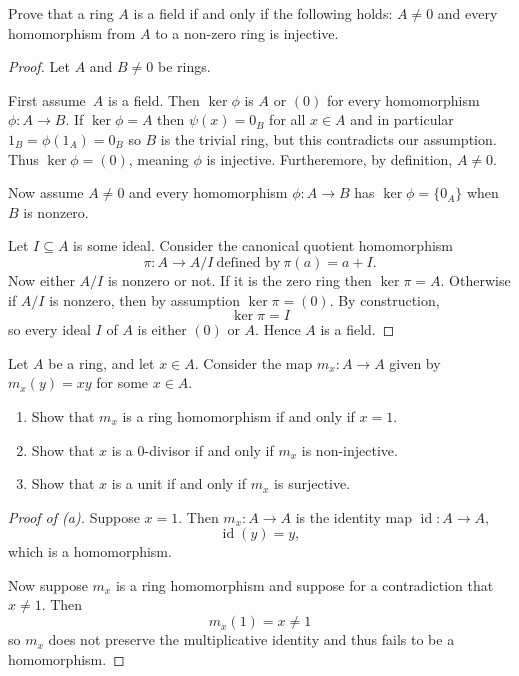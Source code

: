 \begin{prob}
    Prove that a ring $A$ is a field if and only if 
    the following holds: $A \neq 0$ and every homomorphism 
    from $A$ to a non-zero ring is injective. 
\end{prob}
\begin{proof}
    Let $A$ and $B \neq 0$ be rings. 

    First assume $A$ is a field. 
    Then $\ker \phi$ is $A$ or $(0)$ for every homomorphism 
    $\phi : A \to B$. If $\ker \phi = A$ then 
    $\psi(x) = 0_B$ for all $x \in A$ and in particular 
    $1_B = \phi(1_A) = 0_B$ so $B$ is the trivial ring, but 
    this contradicts our assumption. Thus 
    $\ker \phi = (0)$, meaning $\phi$ is injective. Furtheremore, 
    by definition, $A \neq 0$.
    
    Now assume $A \neq 0$ and every homomorphism 
    $\phi : A \to B$ has $\ker \phi = \{0_A\}$ when $B$ is nonzero. 

    Let $I \subseteq A$ is some ideal. Consider the canonical 
    quotient homomorphism 
    \[
        \pi : A \to A/I \ \text{defined by} \ 
        \pi(a) = a+I. 
    \]
    Now either $A/I$ is nonzero or not. If it is the zero ring 
    then $\ker \pi = A$. 
    Otherwise if $A/I$ is nonzero, then by assumption 
    $\ker \pi = (0)$. By construction, 
    \[
        \ker \pi = I
    \]
    so every ideal $I$ of $A$ is either $(0)$ or $A$. Hence 
    $A$ is a field. 
\end{proof}

\begin{prob}
    Let $A$ be a ring, and let $x \in A$. Consider 
    the map $m_x : A \to A$ given by $m_x(y) = xy$ for 
    some $x \in A$. 
    \begin{enumerate}[label=(\alph*)]
        \item Show that $m_x$ is a ring homomorphism if 
            and only if $x = 1$. 
        \item Show that $x$ is a $0$-divisor if and only if 
            $m_x$ is non-injective. 
        \item Show that $x$ is a unit if and only if $m_x$ 
            is surjective. 
    \end{enumerate}
\end{prob}
\begin{proof}[Proof of (a)]
    Suppose $x = 1$. Then $m_x : A \to A$ is the 
    identity map $\operatorname{id} : A \to A$, 
    \[
        \operatorname{id}(y) = y,  
    \]
    which is a homomorphism. 

    Now suppose $m_x$ is a ring homomorphism and suppose 
    for a contradiction that $x \neq 1$. 
    Then 
    \[
        m_x(1) = x \neq 1 
    \]
    so $m_x$ does not preserve the multiplicative 
    identity and thus fails to be a homomorphism. 
\end{proof}

